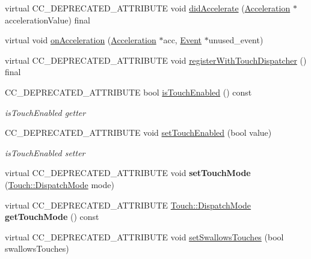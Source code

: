 \begin{DoxyCompactItemize}
\item 
virtual C\+C\+\_\+\+D\+E\+P\+R\+E\+C\+A\+T\+E\+D\+\_\+\+A\+T\+T\+R\+I\+B\+U\+TE void \hyperlink{classLayer_aea727ae25fc6f47bd9ef029cb99c629a}{did\+Accelerate} (\hyperlink{classAcceleration}{Acceleration} $\ast$acceleration\+Value) final
\item 
virtual void \hyperlink{classLayer_a8ae68656f6cceffb0c12336d3bef82cd}{on\+Acceleration} (\hyperlink{classAcceleration}{Acceleration} $\ast$acc, \hyperlink{classEvent}{Event} $\ast$unused\+\_\+event)
\item 
virtual C\+C\+\_\+\+D\+E\+P\+R\+E\+C\+A\+T\+E\+D\+\_\+\+A\+T\+T\+R\+I\+B\+U\+TE void \hyperlink{classLayer_a988787d86ff8b8f1d0d75dcc6c2c181b}{register\+With\+Touch\+Dispatcher} () final
\item 
C\+C\+\_\+\+D\+E\+P\+R\+E\+C\+A\+T\+E\+D\+\_\+\+A\+T\+T\+R\+I\+B\+U\+TE bool \hyperlink{classLayer_a7adf5b4a876042d5a80364f652abe169}{is\+Touch\+Enabled} () const
\begin{DoxyCompactList}\small\item\em is\+Touch\+Enabled getter \end{DoxyCompactList}\item 
\mbox{\label{classLayer_aa2839b0b5e3fc98bd93f9bebd6c6a827}} 
C\+C\+\_\+\+D\+E\+P\+R\+E\+C\+A\+T\+E\+D\+\_\+\+A\+T\+T\+R\+I\+B\+U\+TE void \hyperlink{classLayer_aa2839b0b5e3fc98bd93f9bebd6c6a827}{set\+Touch\+Enabled} (bool value)
\begin{DoxyCompactList}\small\item\em is\+Touch\+Enabled setter \end{DoxyCompactList}\item 
\mbox{\label{classLayer_a4d28faecdc959c2207d1e6d24514a675}} 
virtual C\+C\+\_\+\+D\+E\+P\+R\+E\+C\+A\+T\+E\+D\+\_\+\+A\+T\+T\+R\+I\+B\+U\+TE void {\bfseries set\+Touch\+Mode} (\hyperlink{classTouch_a3970fe1342ce78786781e8383164983d}{Touch\+::\+Dispatch\+Mode} mode)
\item 
\mbox{\label{classLayer_a3438a95d671df2ed7babcc192c342ffa}} 
virtual C\+C\+\_\+\+D\+E\+P\+R\+E\+C\+A\+T\+E\+D\+\_\+\+A\+T\+T\+R\+I\+B\+U\+TE \hyperlink{classTouch_a3970fe1342ce78786781e8383164983d}{Touch\+::\+Dispatch\+Mode} {\bfseries get\+Touch\+Mode} () const
\item 
virtual C\+C\+\_\+\+D\+E\+P\+R\+E\+C\+A\+T\+E\+D\+\_\+\+A\+T\+T\+R\+I\+B\+U\+TE void \hyperlink{classLayer_a97217d10fcefbce95537ea3a4ea04baf}{set\+Swallows\+Touches} (bool swallows\+Touches)

\end{DoxyCompactItemize}
